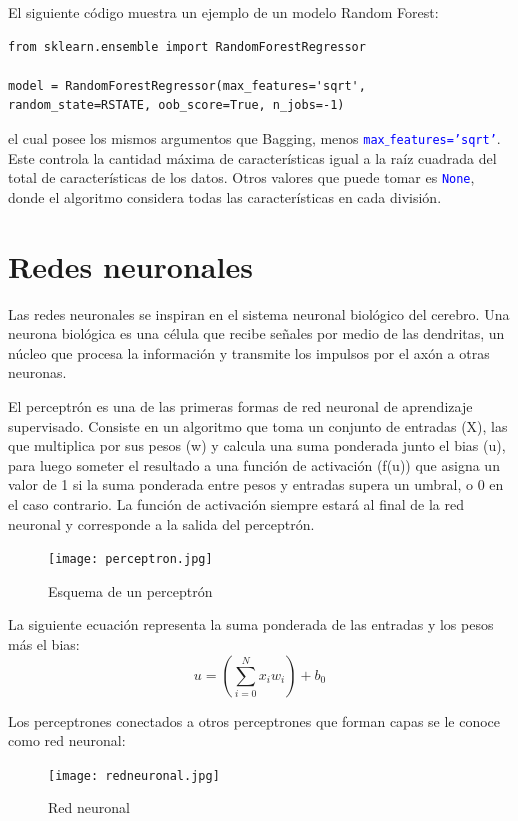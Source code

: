 \documentclass[a4paper, 12pt]{book}
\begin{document}
El siguiente código muestra un ejemplo de un modelo Random Forest:
\begin{verbatim}
from sklearn.ensemble import RandomForestRegressor

model = RandomForestRegressor(max_features='sqrt', random_state=RSTATE, oob_score=True, n_jobs=-1)
\end{verbatim}
el cual posee los mismos argumentos que Bagging, menos \texttt{\textcolor{blue}{max$\_$features='sqrt'}}. Este controla la cantidad máxima de características igual a la raíz cuadrada del total de características de los datos. Otros valores que puede tomar es \texttt{\textcolor{blue}{None}}, donde el algoritmo considera todas las características en cada división.

\section{Redes neuronales}
Las redes neuronales se inspiran en el sistema neuronal biológico del cerebro. Una neurona biológica es una célula que recibe señales por medio de las dendritas, un núcleo que procesa la información y transmite los impulsos por el axón a otras neuronas.

El perceptrón es una de las primeras formas de red neuronal de aprendizaje supervisado. Consiste en un algoritmo que toma un conjunto de entradas (X), las que multiplica por sus pesos (w) y calcula una suma ponderada junto el bias (u), para luego someter el resultado a una función de activación (f(u)) que asigna un valor de 1 si la suma ponderada entre pesos y entradas supera un umbral, o 0 en el caso contrario. La función de activación siempre estará al final de la red neuronal y corresponde a la salida del perceptrón.
\begin{figure}[H] 
	\centering 
	\texttt{[image: perceptron.jpg]}
	\caption{Esquema de un perceptrón}
\end{figure}

La siguiente ecuación representa la suma ponderada de las entradas y los pesos más el bias:
\begin{equation}
	u=(\sum_{i=0}^{N}x_{i}w_{i})+b_{0}
\end{equation}

Los perceptrones conectados a otros perceptrones que forman capas se le conoce como red neuronal:

\begin{figure}[H] 
	\centering 
	\texttt{[image: redneuronal.jpg]}
	\caption{Red neuronal}
\end{figure}
\end{document}
